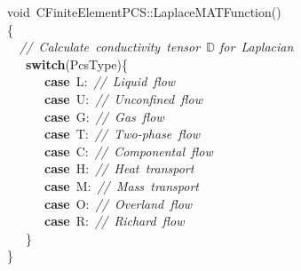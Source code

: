 {\ttfamily \raggedright \small
void\ CFiniteElementPCS::LaplaceMATFunction()\\
\{\\
\ \ \textsl{//\ Calculate\ conductivity\ tensor\ $\mathbb D$ for\ Laplacian}\\
\ \ \ \textbf{switch}(PcsType)\{\\
\ \ \ \ \ \ \textbf{case}\ L:\ \textsl{//\ Liquid\ flow}\\
\ \ \ \ \ \ \textbf{case}\ U:\ \textsl{//\ Unconfined\ flow}\\
\ \ \ \ \ \ \textbf{case}\ G:\ \textsl{//\ Gas\ flow}\\
\ \ \ \ \ \ \textbf{case}\ T:\ \textsl{//\ Two-{}phase\ flow}\\
\ \ \ \ \ \ \textbf{case}\ C:\ \textsl{//\ Componental\ flow}\\
\ \ \ \ \ \ \textbf{case}\ H:\ \textsl{//\ Heat\ transport}\\
\ \ \ \ \ \ \textbf{case}\ M:\ \textsl{//\ Mass\ transport}\\
\ \ \ \ \ \ \textbf{case}\ O:\ \textsl{//\ Overland\ flow}\\
\ \ \ \ \ \ \textbf{case}\ R:\ \textsl{//\ Richard\ flow}\\
\ \ \ \}\\
\}\\
\ \\
 }
\normalfont\normalsize

